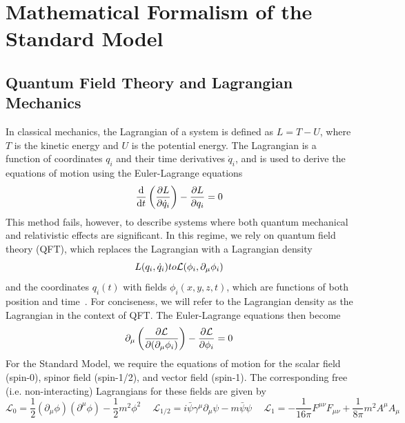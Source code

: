 \chapter{Mathematical Formalism of the Standard Model} \label{sec:sm_theory}

\section{Quantum Field Theory and Lagrangian Mechanics} \label{sec:sm_theory_qft}
In classical mechanics, the Lagrangian of a system is defined as $L=T-U$, where $T$ is the kinetic energy and $U$ is the potential energy. The Lagrangian is a function of coordinates $q_i$ and their time derivatives $\dot{q}_i$, and is used to derive the equations of motion using the Euler-Lagrange equations
\begin{equation}
	\label{eq:eulerlagrange_cm}
	\dv{}{t}\left(\pdv{L}{\dot{q}_i}\right)-\pdv{L}{q_i}=0
\end{equation}
This method fails, however, to describe systems where both quantum mechanical and relativistic effects are significant. In this regime, we rely on quantum field theory (QFT), which replaces the Lagrangian with a Lagrangian density
\begin{equation}
	L(q_i,\dot{q}_i)\to\mathcal{L}(\phi_i,\partial_\mu\phi_i)\\
\end{equation}
and the coordinates $q_i(t)$ with fields $\phi_i(x,y,z,t)$, which are functions of both position and time~\cite{Thomson_2013}. For conciseness, we will refer to the Lagrangian density as the Lagrangian in the context of QFT. The Euler-Lagrange equations then become
\begin{equation}
	\label{eq:eulerlagrange_qft}
	\partial_\mu\left(\pdv{\mathcal{L}}{(\partial_\mu\phi_i)}\right)-\pdv{\mathcal{L}}{\phi_i}=0
\end{equation}
For the Standard Model, we require the equations of motion for the scalar field (spin-0), spinor field (spin-1/2), and vector field (spin-1). The corresponding free (i.e. non-interacting) Lagrangians for these fields are given by
\begin{equation}\label{eq:lagrangians}
	\mathcal{L}_0=\frac{1}{2}\left(\partial_\mu\phi\right)\left(\partial^\mu\phi\right)-\frac{1}{2}m^2\phi^2\quad \ 
	\mathcal{L}_{1/2}=i\bar{\psi}\gamma^\mu\partial_\mu\psi-m\bar{\psi}\psi \quad \ 
	\mathcal{L}_{1}=-\frac{1}{16\pi}F^{\mu\nu}F_{\mu\nu}+\frac{1}{8\pi}m^2A^\mu A_\mu
\end{equation}
